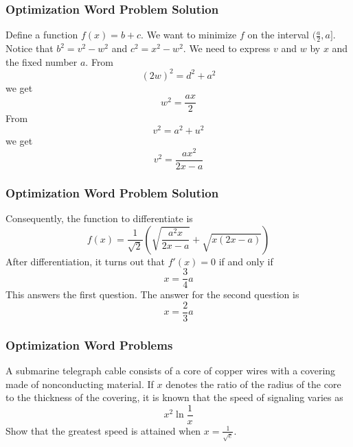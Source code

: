 \documentclass[xcolor=dvipsnames]{beamer}
\begin{document}
\begin{frame}
  \frametitle{Optimization Word Problem Solution}
Define a function $f(x)=b+c$. We want to minimize $f$ on the interval
$(\frac{a}{2},a]$. Notice that $b^{2}=v^{2}-w^{2}$ and
$c^{2}=x^{2}-w^{2}$. We need to express $v$ and $w$ by $x$ and the
fixed number $a$. From
\begin{equation}
  \label{eq:jaithean}
  \left(2w\right)^{2}=d^{2}+a^{2}
\end{equation}
we get
\begin{equation}
  \label{eq:ukohyaej}
  w^{2}=\frac{ax}{2}
\end{equation}
From
\begin{equation}
  \label{eq:loocootu}
  v^{2}=a^{2}+u^{2}
\end{equation}
we get
\begin{equation}
  \label{eq:zoojeefo}
  v^{2}=\frac{ax^{2}}{2x-a}
\end{equation}
\end{frame}

\begin{frame}
  \frametitle{Optimization Word Problem Solution}
  Consequently, the function to differentiate is
  \begin{equation}
    \label{eq:eeguyeex}
    f(x)=\frac{1}{\sqrt{2}}\left(\sqrt{\frac{a^{2}x}{2x-a}}+\sqrt{x(2x-a)}\right)
  \end{equation}
  After differentiation, it turns out that $f'(x)=0$ if and only if
  \begin{equation}
    \label{eq:shohyoom}
    x=\frac{3}{4}a
  \end{equation}
  This answers the first question. The answer for the second question is
  \begin{equation}
    \label{eq:zieshaiv}
    x=\frac{2}{3}a
  \end{equation}
\end{frame}

\begin{frame}
  \frametitle{Optimization Word Problems}
  {\ubung} A submarine telegraph cable consists of a core of copper
  wires with a covering made of nonconducting material. If $x$ denotes
  the ratio of the radius of the core to the thickness of the
  covering, it is known that the speed of signaling varies as
  \begin{equation}
    \label{eq:ehielush}
    x^{2}\ln\frac{1}{x}
  \end{equation}
Show that the greatest speed is attained when $x=\frac{1}{\sqrt{e}}$.
\end{frame}
\end{document}
